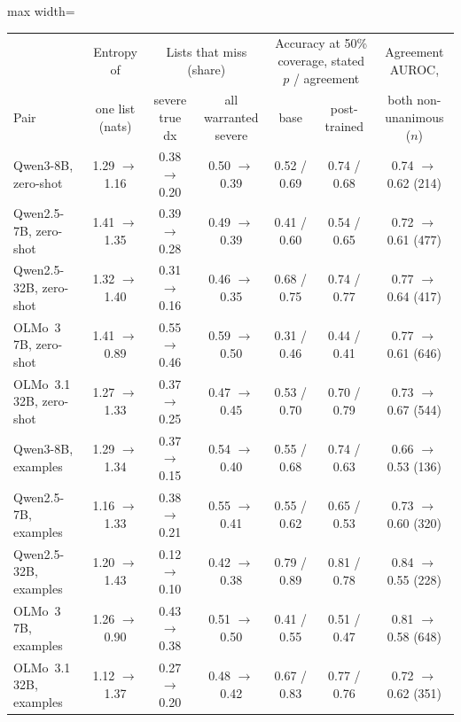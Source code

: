\documentclass[wcp]{jmlr}
\begin{document}
\begin{table}[t]
\centering\small
\begin{adjustbox}{max width=\linewidth}
\begin{tabular}{lcccccc}
\toprule
 & Entropy of & \multicolumn{2}{c}{Lists that miss (share)} & \multicolumn{2}{c}{Accuracy at 50\% coverage, stated $p$ / agreement} & Agreement AUROC, \\
Pair & one list (nats) & severe true dx & all warranted severe & base & post-trained & both non-unanimous ($n$) \\
\midrule
Qwen3-8B, zero-shot & 1.29 $\rightarrow$ 1.16 & 0.38 $\rightarrow$ 0.20 & 0.50 $\rightarrow$ 0.39 & 0.52 / 0.69 & 0.74 / 0.68 & 0.74 $\rightarrow$ 0.62 (214) \\
Qwen2.5-7B, zero-shot & 1.41 $\rightarrow$ 1.35 & 0.39 $\rightarrow$ 0.28 & 0.49 $\rightarrow$ 0.39 & 0.41 / 0.60 & 0.54 / 0.65 & 0.72 $\rightarrow$ 0.61 (477) \\
Qwen2.5-32B, zero-shot & 1.32 $\rightarrow$ 1.40 & 0.31 $\rightarrow$ 0.16 & 0.46 $\rightarrow$ 0.35 & 0.68 / 0.75 & 0.74 / 0.77 & 0.77 $\rightarrow$ 0.64 (417) \\
OLMo~3 7B, zero-shot & 1.41 $\rightarrow$ 0.89 & 0.55 $\rightarrow$ 0.46 & 0.59 $\rightarrow$ 0.50 & 0.31 / 0.46 & 0.44 / 0.41 & 0.77 $\rightarrow$ 0.61 (646) \\
OLMo~3.1 32B, zero-shot & 1.27 $\rightarrow$ 1.33 & 0.37 $\rightarrow$ 0.25 & 0.47 $\rightarrow$ 0.45 & 0.53 / 0.70 & 0.70 / 0.79 & 0.73 $\rightarrow$ 0.67 (544) \\
\midrule
Qwen3-8B, examples & 1.29 $\rightarrow$ 1.34 & 0.37 $\rightarrow$ 0.15 & 0.54 $\rightarrow$ 0.40 & 0.55 / 0.68 & 0.74 / 0.63 & 0.66 $\rightarrow$ 0.53 (136) \\
Qwen2.5-7B, examples & 1.16 $\rightarrow$ 1.33 & 0.38 $\rightarrow$ 0.21 & 0.55 $\rightarrow$ 0.41 & 0.55 / 0.62 & 0.65 / 0.53 & 0.73 $\rightarrow$ 0.60 (320) \\
Qwen2.5-32B, examples & 1.20 $\rightarrow$ 1.43 & 0.12 $\rightarrow$ 0.10 & 0.42 $\rightarrow$ 0.38 & 0.79 / 0.89 & 0.81 / 0.78 & 0.84 $\rightarrow$ 0.55 (228) \\
OLMo~3 7B, examples & 1.26 $\rightarrow$ 0.90 & 0.43 $\rightarrow$ 0.38 & 0.51 $\rightarrow$ 0.50 & 0.41 / 0.55 & 0.51 / 0.47 & 0.81 $\rightarrow$ 0.58 (648) \\
OLMo~3.1 32B, examples & 1.12 $\rightarrow$ 1.37 & 0.27 $\rightarrow$ 0.20 & 0.48 $\rightarrow$ 0.42 & 0.67 / 0.83 & 0.77 / 0.76 & 0.72 $\rightarrow$ 0.62 (351) \\

\end{tabular}
\end{adjustbox}
\end{table}
\end{document}
